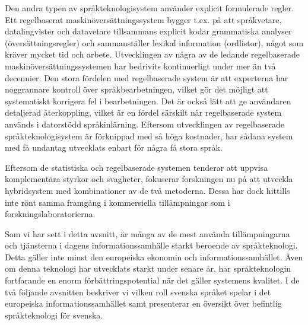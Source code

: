 \begin{multicols}{2}
Den andra typen av språkteknologisystem använder explicit formulerade
regler. Ett regelbaserat maskin\-över\-sätt\-nings\-system bygger
t.ex. på att språkvetare, datalingvister och datavetare tillsammans
explicit kodar grammatiska analyser (översättningsregler) och
sammanställer lexikal information (ordlistor), något som kräver mycket
tid och arbete. Utvecklingen av några av de ledande regelbaserade
maskinöversättningssystemen har bedrivits kontinuerligt under mer än
två decennier. Den stora fördelen med regelbaserade system är att
experterna har noggrannare kontroll över språkbearbetningen, vilket
gör det möjligt att systematiskt korrigera fel i bearbetningen. Det är
också lätt att ge användaren detaljerad återkoppling, vilket är en
fördel särskilt när regelbaserade system används i datorstödd
språkinlärning. Eftersom utvecklingen av regelbaserade
språkteknologisystem är förknippad med så höga kostnader, har sådana
system med få undantag utvecklats enbart för några få stora språk.

Eftersom de statistiska och regelbaserade systemen tenderar att
uppvisa komplementära styrkor och svagheter, fokuserar forskningen nu
på att utveckla hybridsystem med kombinationer av de två
metoderna. Dessa har dock hittills inte rönt samma framgång i
kommersiella tillämpningar som i forskningslaboratorierna.


Som vi har sett i detta avsnitt, är många av de mest använda
tillämpningarna och tjänsterna i dagens informationssamhälle starkt
beroende av språkteknologi. Detta gäller inte minst den europeiska
ekonomin och informationssamhället. Även om denna teknologi har
utvecklats starkt under senare år, har språkteknologin fortfarande en
enorm förbättringspotential när det gäller systemens kvalitet. I de
två följande avsnitten beskriver vi vilken roll svenska språket spelar
i det europeiska informationssamhället samt presenterar en översikt
över befintlig språkteknologi för svenska.


\end{multicols}

\clearpage



